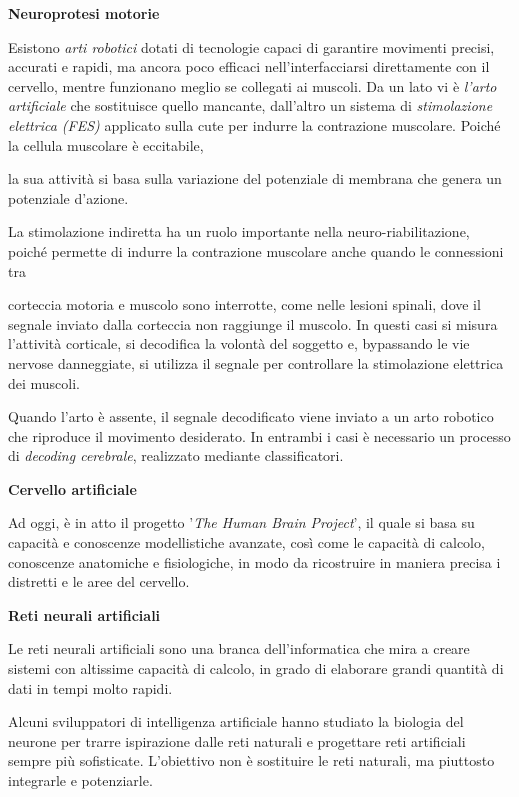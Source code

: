 \documentclass[12pt,a4paper,openany]{book}
\begin{document}
\textbf{Neuroprotesi motorie}

Esistono \textit{arti robotici }dotati di tecnologie capaci di garantire movimenti precisi, accurati e rapidi, ma ancora poco efficaci nell'interfacciarsi direttamente con il cervello, mentre funzionano meglio se collegati ai muscoli. Da un lato vi è \textit{l'arto artificiale }che sostituisce quello mancante, dall'altro un sistema di \textit{stimolazione elettrica (FES) }applicato sulla cute per indurre la contrazione muscolare. Poiché la cellula muscolare è eccitabile,

la sua attività si basa sulla variazione del potenziale di membrana che genera un potenziale d'azione.

La stimolazione indiretta ha un ruolo importante nella neuro-riabilitazione, poiché permette di indurre la contrazione muscolare anche quando le connessioni tra

corteccia motoria e muscolo sono interrotte, come nelle lesioni spinali, dove il segnale inviato dalla corteccia non raggiunge il muscolo. In questi casi si misura l'attività corticale, si decodifica la volontà del soggetto e, bypassando le vie nervose danneggiate, si utilizza il segnale per controllare la stimolazione elettrica dei muscoli.

Quando l'arto è assente, il segnale decodificato viene inviato a un arto robotico che riproduce il movimento desiderato. In entrambi i casi è necessario un processo di \textit{decoding cerebrale}, realizzato mediante classificatori.

\textbf{Cervello artificiale}

Ad oggi, è in atto il progetto '\textit{The Human Brain Project}', il quale si basa su capacità e conoscenze modellistiche avanzate, così come le capacità di calcolo, conoscenze anatomiche e fisiologiche, in modo da ricostruire in maniera precisa i distretti e le aree del cervello.

\textbf{Reti neurali artificiali}

Le reti neurali artificiali sono una branca dell'informatica che mira a creare sistemi con altissime capacità di calcolo, in grado di elaborare grandi quantità di dati in tempi molto rapidi.

Alcuni sviluppatori di intelligenza artificiale hanno studiato la biologia del neurone per trarre ispirazione dalle reti naturali e progettare reti artificiali sempre più sofisticate. L'obiettivo non è sostituire le reti naturali, ma piuttosto integrarle e potenziarle.
\end{document}
